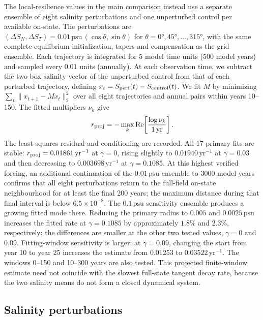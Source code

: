 \documentclass[12pt, a4paper]{article}
\newcommand{\psu}{\,\text{psu}}
\begin{document}
The local-resilience values in the main comparison instead use a separate ensemble of eight salinity perturbations and one unperturbed control per available on-state. The perturbations are $(\Delta S_N,\Delta S_T)=0.01\psu{}\,(\cos\theta,\sin\theta)$ for $\theta=0°,45°,\ldots,315°$, with the same complete equilibrium initialization, tapers and compensation as the grid ensemble. Each trajectory is integrated for 5 model time units (500 model years) and sampled every 0.01 units (annually). At each observation time, we subtract the two-box salinity vector of the unperturbed control from that of each perturbed trajectory, defining $x_t=S_{\rm pert}(t)-S_{\rm control}(t)$. We fit $M$ by minimizing $\sum_t\|x_{t+1}-Mx_t\|_2^2$ over all eight trajectories and annual pairs within years 10--150. The fitted multipliers $\nu_k$ give
\begin{equation}
 r_{\rm proj}=-\max_k\mathrm{Re}\!\left[\frac{\log\nu_k}{1\,\mathrm{yr}}\right].
\end{equation}
The least-squares residual and conditioning are recorded. All 17 primary fits are stable: $r_{\rm proj}=0.01861\,\mathrm{yr}^{-1}$ at $\gamma=0$, rising slightly to $0.01940\,\mathrm{yr}^{-1}$ at $\gamma=0.03$ and then decreasing to $0.003698\,\mathrm{yr}^{-1}$ at $\gamma=0.1085$. At this highest verified forcing, an additional continuation of the $0.01\psu{}$ ensemble to 3000 model years confirms that all eight perturbations return to the full-field on-state neighbourhood for at least the final 200 years; the maximum distance during that final interval is below $6.5\times10^{-8}$. The $0.1\psu{}$ sensitivity ensemble produces a growing fitted mode there. Reducing the primary radius to $0.005$ and $0.0025\psu{}$ increases the fitted rate at $\gamma=0.1085$ by approximately $1.8\%$ and $2.3\%$, respectively; the differences are smaller at the other two tested values, $\gamma=0$ and $0.09$. Fitting-window sensitivity is larger: at $\gamma=0.09$, changing the start from year 10 to year 25 increases the estimate from $0.01253$ to $0.03522\,\mathrm{yr}^{-1}$. The windows 0--150 and 10--300 years are also tested. This projected finite-window estimate need not coincide with the slowest full-state tangent decay rate, because the two salinity means do not form a closed dynamical system.

\subsection*{Salinity perturbations}
\end{document}
